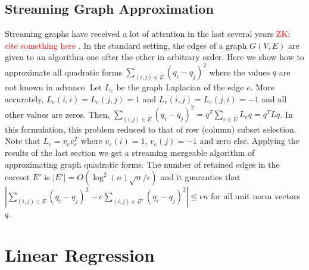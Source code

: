 \documentclass[anon,12pt]{colt2019} %
\newcommand{\zk}[1]{\textcolor{red}{ZK: #1}}
\newcommand{\eps}{\epsilon}
\begin{document}
\subsection{Streaming Graph Approximation}
Streaming graphs have received a lot of attention in the last several years \zk{cite something here \cite{}}. 
In the standard setting, the edges of a graph $G(V,E)$ are given to an algorithm one ofter the other in arbitrary order.
Here we show how to approximate all quadratic forms $\sum_{(i,j) \in E} (q_i - q_j)^2$ where the values $q$ are not known in advance.
Let $L_e$ be the graph Laplacian of the edge $e$. More accurately, $L_e(i,i) = L_e(j,j) = 1$ and  $L_e(i,j) = L_e(j,i) = -1$ and all other values are zeros.
Then, $\sum_{(i,j) \in E} (q_i - q_j)^2 = q^T \sum_{e \in E}L_e q = q^T L q$. 
In this formulation, this problem reduced to that of row (column) subset selection. 
Note that $L_e = v_ev_e^T$ where $v_e(i) = 1$, $v_e(j)=-1$ and zero else.
Applying the results of the last section we get a streaming mergeable algorithm of approximating graph quadratic forms.
The number of retained edges in the coreset $E'$ is $|E'| = O(\log^{2}(n) \sqrt{n}/\eps)$ and it guaranties that 
$|\sum_{(i,j) \in E} (q_i - q_j)^2  - c \sum_{(i,j) \in E'} (q_i - q_j)^2| \le \eps n$ for all unit norm vectors $q$.



\section{Linear Regression}
\end{document}
